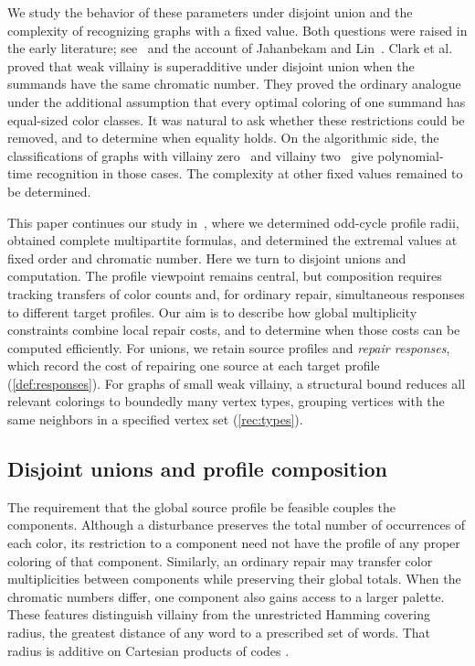 \documentclass[11pt,reqno]{amsart}
\numberwithin{equation}{section}
\theoremstyle{definition}
\theoremstyle{remark}
\begin{document}
We study the behavior of these parameters under disjoint union and the
complexity of recognizing graphs with a fixed value. Both questions
were raised in the early literature; see~\cite{clark2006,west2006} and
the account of Jahanbekam and Lin~\cite{jahanbekam2021}. Clark et al.
proved that weak villainy is superadditive under disjoint union when
the summands have the same chromatic number. They proved the ordinary
analogue under the additional assumption that every optimal coloring
of one summand has equal-sized color classes. It was natural to ask
whether these restrictions could be removed, and to determine when
equality holds. On the algorithmic side, the classifications of graphs
with villainy zero~\cite{clark2006} and villainy
two~\cite{jahanbekam2021} give polynomial-time recognition in those
cases. The complexity at other fixed values remained to be determined.

This paper continues our study in~\cite{jiang2026exact}, where we
determined odd-cycle profile radii, obtained complete multipartite
formulas, and determined the extremal values at fixed order and
chromatic number. Here we turn to disjoint unions and computation.
The profile viewpoint remains central, but composition requires
tracking transfers of color counts and, for ordinary repair,
simultaneous responses to different target profiles.
Our aim is to describe how global multiplicity constraints combine
local repair costs, and to determine when those costs can be computed
efficiently. For unions, we retain source profiles and \emph{repair
responses}, which record the cost of repairing one source at each
target profile (\cref{def:responses}). For graphs of small weak
villainy, a structural bound reduces all relevant colorings to boundedly
many vertex types, grouping vertices with the same neighbors in a
specified vertex set (\cref{rec:types}).

\subsection{Disjoint unions and profile composition}

The requirement that the global source profile be feasible couples
the components.
Although a disturbance preserves the total number of occurrences of
each color, its restriction to a component need not have the profile
of any proper coloring of that component. Similarly, an ordinary
repair may transfer color multiplicities between components while
preserving their global totals. When the chromatic numbers differ,
one component also gains access to a larger palette. These features
distinguish villainy from the unrestricted Hamming covering radius,
the greatest distance of any word to a prescribed set of words.
That radius is additive on Cartesian products of codes
\cite[Section~II.C]{cohen1985}.
\end{document}
